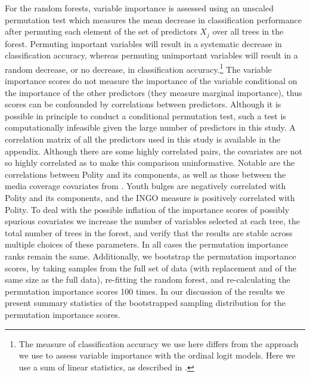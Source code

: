 \documentclass[12pt]{article}
\begin{document}
For the random forests, variable importance is assessed using an unscaled permutation test which measures the mean decrease in classification performance after permuting each element of the set of predictors $X_j$ over all trees in the forest. Permuting important variables will result in a systematic decrease in classification accuracy, whereas permuting unimportant variables will result in a random decrease, or no decrease, in classification accuracy.\footnote{The measure of classification accuracy we use here differs from the approach we use to assess variable importance with the ordinal logit models. Here we use a sum of linear statistics, as described in \citet{hothorn2006unbiased}.} The variable importance scores do not measure the importance of the variable conditional on the importance of the other predictors (they measure marginal importance), thus scores can be confounded by correlations between predictors. Although it is possible in principle to conduct a conditional permutation test, such a test is computationally infeasible given the large number of predictors in this study. A correlation matrix of all the predictors used in this study is available in the appendix. Although there are some highly correlated pairs, the covariates are not so highly correlated as to make this comparison uninformative. Notable are the correlations between Polity and its components, as well as those between the media coverage covariates from \citet{RonRamosRodgers2005}. Youth bulges are negatively correlated with Polity and its components, and the INGO measure is positively correlated with Polity. To deal with the possible inflation of the importance scores of possibly spurious covariates we increase the number of variables selected at each tree, the total number of trees in the forest, and verify that the results are stable across multiple choices of these parameters. In all cases the permutation importance ranks remain the same. Additionally, we bootstrap the permutation importance scores, by taking samples from the full set of data (with replacement and of the same size as the full data), re-fitting the random forest, and re-calculating the permutation importance scores 100 times. In our discussion of the results we present summary statistics of the bootstrapped sampling distribution for the permutation importance scores.
\end{document}
